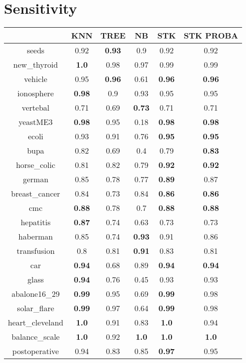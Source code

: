 \documentclass{article}%
\begin{document}
\section*{Sensitivity}%
\begin{tabular}{c|ccccc}%
&KNN&TREE&NB&STK&STK PROBA\\%
\hline%
seeds&0.92&\textbf{0.93}&0.9&0.92&0.92\\%
new\_thyroid&\textbf{1.0}&0.98&0.97&0.99&0.99\\%
vehicle&0.95&\textbf{0.96}&0.61&\textbf{0.96}&\textbf{0.96}\\%
ionosphere&\textbf{0.98}&0.9&0.93&0.95&0.95\\%
vertebal&0.71&0.69&\textbf{0.73}&0.71&0.71\\%
yeastME3&\textbf{0.98}&0.95&0.18&\textbf{0.98}&\textbf{0.98}\\%
ecoli&0.93&0.91&0.76&\textbf{0.95}&\textbf{0.95}\\%
bupa&0.82&0.69&0.4&0.79&\textbf{0.83}\\%
horse\_colic&0.81&0.82&0.79&\textbf{0.92}&\textbf{0.92}\\%
german&0.85&0.78&0.77&\textbf{0.89}&0.87\\%
breast\_cancer&0.84&0.73&0.84&\textbf{0.86}&\textbf{0.86}\\%
cmc&\textbf{0.88}&0.78&0.7&\textbf{0.88}&\textbf{0.88}\\%
hepatitis&\textbf{0.87}&0.74&0.63&0.73&0.73\\%
haberman&0.85&0.74&\textbf{0.93}&0.91&0.86\\%
transfusion&0.8&0.81&\textbf{0.91}&0.83&0.81\\%
car&\textbf{0.94}&0.68&0.89&\textbf{0.94}&\textbf{0.94}\\%
glass&\textbf{0.94}&0.76&0.45&0.93&0.93\\%
abalone16\_29&\textbf{0.99}&0.95&0.69&\textbf{0.99}&0.98\\%
solar\_flare&\textbf{0.99}&0.97&0.64&\textbf{0.99}&0.98\\%
heart\_cleveland&\textbf{1.0}&0.91&0.83&\textbf{1.0}&0.94\\%
balance\_scale&\textbf{1.0}&0.92&\textbf{1.0}&\textbf{1.0}&\textbf{1.0}\\%
postoperative&0.94&0.83&0.85&\textbf{0.97}&0.95\\%
\end{tabular}

%
\end{document}
